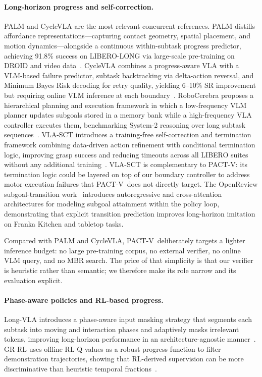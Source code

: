 \documentclass[10pt]{article}
\newcommand{\method}{\textsc{PACT-V}\xspace}
\begin{document}
\paragraph{Long-horizon progress and self-correction.}
PALM and CycleVLA are the most relevant concurrent references.
PALM distills affordance representations---capturing contact geometry, spatial
placement, and motion dynamics---alongside a continuous within-subtask progress
predictor, achieving 91.8\% success on LIBERO-LONG via large-scale pre-training
on DROID and video data~\cite{palm}.
CycleVLA combines a progress-aware VLA with a VLM-based failure predictor,
subtask backtracking via delta-action reversal, and Minimum Bayes Risk decoding
for retry quality, yielding 6--10\% SR improvement but requiring online VLM
inference at each boundary~\cite{cyclevla}.
RoboCerebra proposes a hierarchical planning and execution framework in which a
low-frequency VLM planner updates subgoals stored in a memory bank while a
high-frequency VLA controller executes them, benchmarking System-2 reasoning over
long subtask sequences~\cite{robocerebra}.
VLA-SCT introduces a training-free self-correction and termination framework
combining data-driven action refinement with conditional termination logic,
improving grasp success and reducing timeouts across all LIBERO suites
without any additional training~\cite{vlasct}.
VLA-SCT is complementary to \method: its termination logic could be layered on
top of our boundary controller to address motor execution failures that
\method\ does not directly target.
The OpenReview subgoal-transition work~\cite{subgoaltransition} introduces
autoregressive and cross-attention architectures for modeling subgoal attainment
within the policy loop, demonstrating that explicit transition prediction
improves long-horizon imitation on Franka Kitchen and tabletop tasks.

Compared with PALM and CycleVLA, \method\ deliberately targets a lighter
inference budget: no large pre-training corpus, no external verifier, no online
VLM query, and no MBR search.
The price of that simplicity is that our verifier is heuristic rather than
semantic; we therefore make its role narrow and its evaluation explicit.

\paragraph{Phase-aware policies and RL-based progress.}
Long-VLA introduces a phase-aware input masking strategy that segments each
subtask into moving and interaction phases and adaptively masks irrelevant tokens,
improving long-horizon performance in an architecture-agnostic
manner~\cite{longhorizonvla}.
GR-RL uses offline RL Q-values as a robust progress function to filter
demonstration trajectories, showing that RL-derived supervision can be more
discriminative than heuristic temporal fractions~\cite{grrl}.
\end{document}
